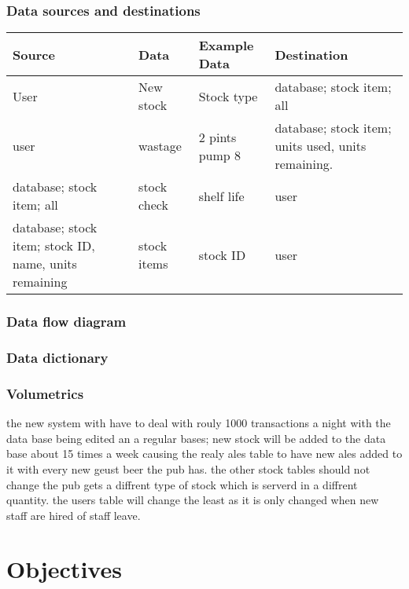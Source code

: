 \subsubsection{Data sources and destinations}
\begin{center}
\begin{tabular}{|l|l|l|l|}
    \hline
    \textbf{Source} & \textbf{Data} & \textbf{Example Data} & \textbf{Destination} \\ \hline
	User & New stock & Stock type & database; stock item; all \\ \hline
	user & wastage & 2 pints pump 8 &database; stock item; units used, units remaining. \\ \hline
	database; stock item; all & stock check & shelf life & user \\ \hline
	database; stock item; stock ID, name, units remaining & stock items & stock ID & user \\ \hline
	
	
    
\end{tabular}
\label{tab:range_examples}
\end{center}

\subsubsection{Data flow diagram}

\subsubsection{Data dictionary}

\subsubsection{Volumetrics}

 the new system with have to deal with rouly 1000 transactions a night with the data base being edited an a regular bases; new stock will be added to the data base about 15 times a week causing the realy ales table to have new ales added to it with every new geust beer the pub has. the other stock tables should not change the pub gets a diffrent type of stock which is serverd in a diffrent quantity. the users table will change the least as it is only changed when new staff are hired of staff leave.

\section{Objectives}

